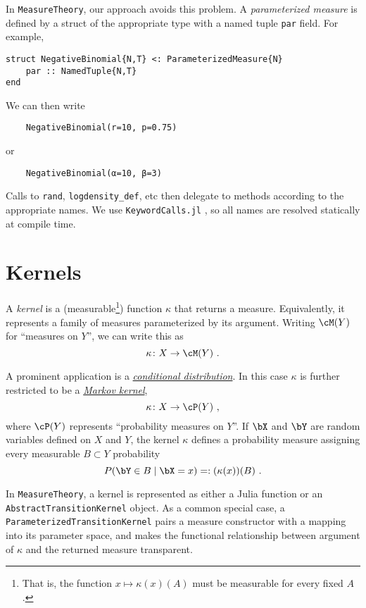 \documentclass{juliacon}
\begin{document}
In \verb|MeasureTheory|, our approach avoids this problem. A \emph{parameterized measure} is defined by a struct of the appropriate type with a named tuple \verb|par| field. For example,

\begin{verbatim}
struct NegativeBinomial{N,T} <: ParameterizedMeasure{N}
    par :: NamedTuple{N,T}
end
\end{verbatim}

We can then write 
\begin{verbatim}
    NegativeBinomial(r=10, p=0.75)
\end{verbatim}
or
\begin{verbatim}
    NegativeBinomial(α=10, β=3)
\end{verbatim}

Calls to \verb|rand|, \verb|logdensity_def|, etc then delegate to methods according to the appropriate names. We use \verb|KeywordCalls.jl| \cite{KeywordCalls.jl}, so all names are resolved statically at compile time.

\section{Kernels}

A \emph{kernel} is a (measurable\footnote{That is, the function $x \mapsto \kappa(x)(A)$ must be measurable for every fixed $A$.}) function $\kappa$ that returns a measure. Equivalently, it represents a family of measures parameterized by its argument. Writing $\cM(Y)$ for ``measures on $Y$'', we can write this as
\[
\kappa\colon X \to \cM(Y)\ .
\]

A prominent application is a \href{https://en.wikipedia.org/wiki/Conditional_probability_distribution}{\emph{conditional distribution}}. In this case $\kappa$ is further restricted to be a \href{https://en.wikipedia.org/wiki/Markov_kernel}{\emph{Markov kernel}}, 
\[
\kappa\colon X \to \cP(Y)\ ,
\]
where $\cP(Y)$ represents ``probability measures on $Y$''.
If $\bX$ and $\bY$ are random variables defined on $X$ and $Y$, the kernel $\kappa$ defines a probability measure assigning every measurable $B\subset Y$ probability
\[
P(\bY \in B \mid \bX = x) =: (\kappa(x))(B)\ .
\]

In \verb|MeasureTheory|, a kernel is represented as either a Julia function or an \verb|AbstractTransitionKernel| object.
As a common special case, a \verb|ParameterizedTransitionKernel| pairs a measure constructor with a mapping into its parameter space, and makes the functional relationship between argument of $\kappa$ and the returned measure transparent.
\end{document}
